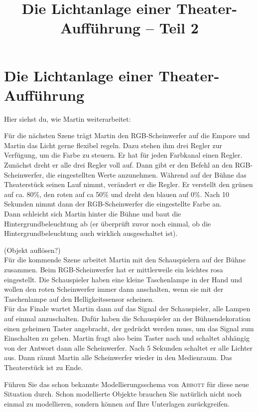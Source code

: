 \documentclass[11pt, a4paper]{scrartcl}
\title{Die Lichtanlage einer Theater-Aufführung -- Teil 2}
\begin{document}
\section*{Die Lichtanlage einer Theater-Aufführung}

Hier siehst du, wie Martin weiterarbeitet:

\begin{mdframed}
Für die nächsten Szene trägt Martin den RGB-Scheinwerfer auf die Empore und Martin das Licht gerne flexibel regeln. Dazu stehen ihm drei Regler zur Verfügung, um die Farbe zu steuern. Er hat für jeden Farbkanal einen Regler.\\

Zunächst dreht er alle drei Regler voll auf. Dann gibt er den Befehl an den RGB-Scheinwerfer, die eingestellten Werte anzunehmen. Während auf der Bühne das Theaterstück seinen Lauf nimmt, verändert er die Regler. Er verstellt den grünen auf ca. 80\%, den roten auf ca 50\% und dreht den blauen auf 0\%. Nach 10 Sekunden nimmt dann der RGB-Scheinwerfer die eingestellte Farbe an.\\

Dann schleicht sich Martin hinter die Bühne und baut die Hintergrundbeleuchtung ab (er überprüft zuvor noch einmal, ob die Hintergrundbeleuchtung auch wirklich ausgeschaltet ist).

(Objekt auflösen?)\\

Für die kommende Szene arbeitet Martin mit den Schauspielern auf der Bühne zusammen. Beim RGB-Scheinwerfer hat er mittlerweile ein leichtes rosa eingestellt. Die Schauspieler haben eine kleine Taschenlampe in der Hand und wollen den roten Scheinwerfer immer dann anschalten, wenn sie mit der Taschenlampe auf den Helligkeitssensor scheinen.\\

Für das Finale wartet Martin dann auf das Signal der Schauspieler, alle Lampen auf einmal anzuschalten. Dafür haben die Schauspieler an der Bühnendekoration einen geheimen Taster angebracht, der gedrückt werden muss, um das Signal zum Einschalten zu geben. Martin fragt also beim Taster nach und schaltet abhängig von der Antwort dann alle Scheinwerfer. Nach 5 Sekunden schaltet er alle Lichter aus. Dann räumt Martin alle Scheinwerfer wieder in den Medienraum. Das Theaterstück ist zu Ende. 
\end{mdframed}

\vfill

\begin{aufgabe}
Führen Sie das schon bekannte Modellierungsschema von \textsc{Abbott} für diese neue Situation durch. Schon modellierte Objekte brauchen Sie natürlich nicht noch einmal zu modellieren, sondern können auf Ihre Unterlagen zurückgreifen.
\end{aufgabe}
\end{document}
